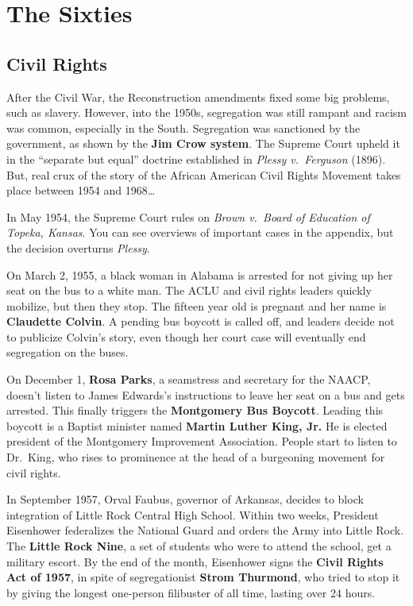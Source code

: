 \section{The Sixties}

\subsection*{Civil Rights}

After the Civil War, the Reconstruction amendments fixed some big problems, such as slavery.
However, into the 1950s, segregation was still rampant and racism was common, especially in the South.
Segregation was sanctioned by the government, as shown by the \textbf{Jim Crow system}.
The Supreme Court upheld it in the ``separate but equal'' doctrine
established in \textit{Plessy v.\ Ferguson} (1896).
But, real crux of the story of the African American Civil Rights Movement takes place between 1954 and 1968\ldots{}

In May 1954, the Supreme Court rules on \textit{Brown v.\ Board of Education of Topeka, Kansas}.
You can see overviews of important cases in the appendix, but the decision overturns \textit{Plessy}.

On March 2, 1955, a black woman in Alabama is arrested for not giving up her seat on the bus to a white man.
The ACLU and civil rights leaders quickly mobilize, but then they stop.
The fifteen year old is pregnant and her name is \textbf{Claudette Colvin}.
A pending bus boycott is called off, and leaders decide not to publicize Colvin's story,
even though her court case will eventually end segregation on the buses.

On December 1, \textbf{Rosa Parks}, a seamstress and secretary for the NAACP,
doesn't listen to James Edwards's instructions to leave her seat on a bus and gets arrested.
This finally triggers the \textbf{Montgomery Bus Boycott}.
Leading this boycott is a Baptist minister named \textbf{Martin Luther King, Jr.}
He is elected president of the Montgomery Improvement Association.
People start to listen to Dr.\ King, who rises to prominence at the head of a burgeoning movement for civil rights.

In September 1957, Orval Faubus, governor of Arkansas,
decides to block integration of Little Rock Central High School.
Within two weeks, President Eisenhower federalizes the National Guard and orders the Army into Little Rock.
The \textbf{Little Rock Nine}, a set of students who were to attend the school, get a military escort.
By the end of the month, Eisenhower signs the \textbf{Civil Rights Act of 1957},
in spite of segregationist \textbf{Strom Thurmond},
who tried to stop it by giving the longest one-person filibuster of all time, lasting over 24 hours.

